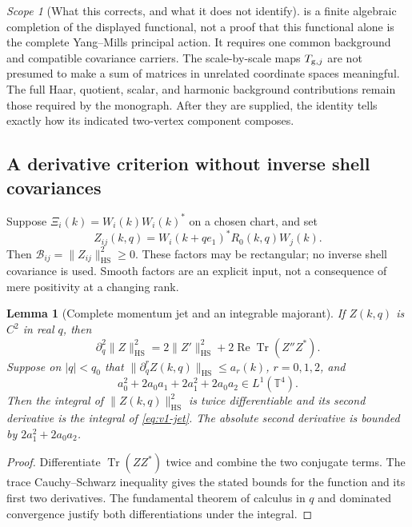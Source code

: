 \documentclass[11pt,a4paper]{article}
\newtheorem{lemma}[lemma]{Lemma}
\theoremstyle{definition}
\theoremstyle{remark}
\newtheorem{scope}[scope]{Scope}
\DeclareMathOperator{\Tr}{Tr}
\DeclareMathOperator{\Rea}{Re}
\newcommand{\T}{\mathbb T}
\newcommand{\norm}[1]{\lVert #1\rVert}
\newcommand{\HS}{\mathrm{HS}}
\begin{document}
\begin{scope}[What this corrects, and what it does not identify]
 is a finite algebraic completion of the displayed
functional, not a proof that this functional alone is the complete
Yang--Mills principal action. It requires one common background and
compatible covariance carriers. The scale-by-scale maps $T_{{\rm g},j}$
are not presumed to make a sum of matrices in unrelated coordinate
spaces meaningful. The full Haar, quotient, scalar, and harmonic
background contributions remain those required by the monograph.
After they are supplied, the identity tells exactly how its indicated
two-vertex component composes.
\end{scope}

\subsection{A derivative criterion without inverse shell covariances}
Suppose $\Xi_i(k)=W_i(k)W_i(k)^*$ on a chosen chart, and set
\[
 Z_{ij}(k,q)=W_i(k+qe_1)^*R_0(k,q)W_j(k).
\]
Then $\mathcal B_{ij}=\norm{Z_{ij}}_\HS^2\ge0$. These factors may be
rectangular; no inverse shell covariance is used. Smooth factors are
an explicit input, not a consequence of mere positivity at a changing
rank.

\begin{lemma}[Complete momentum jet and an integrable majorant]
\label{lem:v1-jet}
If $Z(k,q)$ is $C^2$ in real $q$, then
\begin{equation}\label{eq:v1-jet}
 \partial_q^2\norm{Z}_\HS^2
       =2\norm{Z'}_\HS^2+2\Rea\Tr(Z''Z^*).
\end{equation}
Suppose on $|q|<q_0$ that
$\norm{\partial_q^rZ(k,q)}_\HS\le a_r(k)$, $r=0,1,2$, and
\begin{equation}\label{eq:v1-majorant}
 a_0^2+2a_0a_1+2a_1^2+2a_0a_2\in L^1(\T^4).
\end{equation}
Then the integral of $\norm{Z(k,q)}_\HS^2$ is twice differentiable and its
second derivative is the integral of \cref{eq:v1-jet}. The absolute
second derivative is bounded by $2a_1^2+2a_0a_2$.
\end{lemma}
\begin{proof}
Differentiate $\Tr(ZZ^*)$ twice and combine the two conjugate terms.
The trace Cauchy--Schwarz inequality gives the stated bounds for the
function and its first two derivatives. The fundamental theorem of
calculus in $q$ and dominated convergence justify both differentiations
under the integral.
\end{proof}
\end{document}
